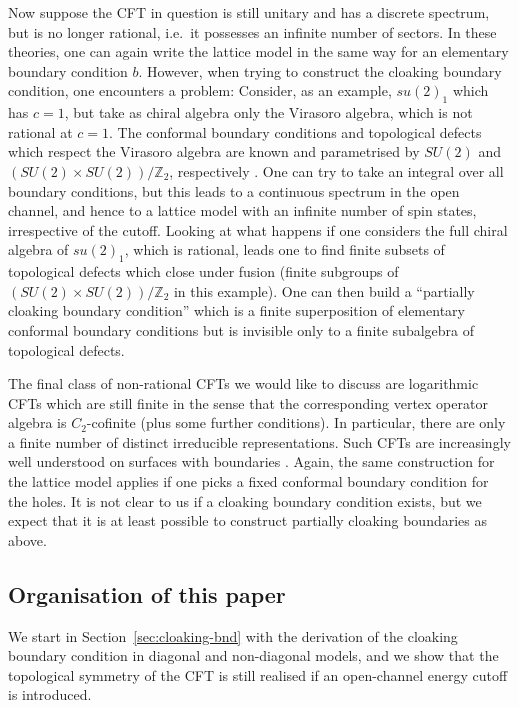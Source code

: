 \documentclass[11pt,a4paper]{article}
\numberwithin{equation}{section}
\begin{document}
Now suppose the CFT in question is still unitary and has a discrete spectrum, but is no longer rational, i.e.\ it possesses an infinite number of sectors.  In these theories, one can again write the lattice model in the same way for an elementary boundary condition $b$. However, when trying to construct the cloaking boundary condition, one encounters a problem:
Consider, as an example, $su(2)_1$ which has $c=1$, but take as chiral algebra only the Virasoro algebra, which is not rational at $c=1$. The conformal boundary conditions and topological defects which respect the Virasoro algebra are known and parametrised by $SU(2)$ and $(SU(2) \times SU(2))/\mathbb{Z}_2$, respectively \cite{Gaberdiel:2001xm,Fuchs:2007tx}. One can try to take an integral over all boundary conditions, but this leads to a continuous spectrum in the open channel, and hence to a lattice model with an infinite number of spin states, irrespective of the cutoff. Looking at what happens if one considers the full chiral algebra of $su(2)_1$, which is rational, leads one to find finite subsets of topological defects which close under fusion \cite{Thorngren:2021yso} (finite subgroups of $(SU(2) \times SU(2))/\mathbb{Z}_2$ in this example). One can then build a ``partially cloaking boundary condition'' which is a finite superposition of elementary conformal boundary conditions but is invisible only to a finite subalgebra of topological defects.

The final class of non-rational CFTs we would like to discuss are logarithmic CFTs which are still finite in the sense that the corresponding vertex operator algebra is $C_2$-cofinite (plus some further conditions). In particular, there are only a finite number of distinct irreducible representations. Such CFTs are increasingly well understood on surfaces with boundaries \cite{Runkel:2012rp,Creutzig:2016fms,Fuchs:2017unc}. Again, the same construction for the lattice model applies if one picks a fixed conformal boundary condition for the holes. It is not clear to us if a cloaking boundary condition exists, but we expect that it is at least possible to construct partially cloaking boundaries as above. 

\bigskip

\subsection*{Organisation of this paper}

We start in Section~\ref{sec:cloaking-bnd} with the derivation of the cloaking boundary condition in diagonal and non-diagonal models, and we show that the topological symmetry of the CFT is still realised if an open-channel energy cutoff is introduced.
\end{document}
